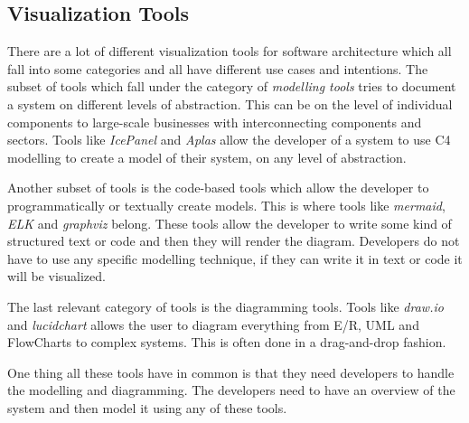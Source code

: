 \subsection{Visualization Tools}
There are a lot of different visualization tools for software architecture which all fall into some categories and all have different use cases and intentions.
The subset of tools which fall under the category of \textit{modelling tools} tries to document a system on different levels of abstraction. This can be on the level of individual components to large-scale businesses with interconnecting components and sectors.
Tools like \textit{IcePanel} and \textit{Aplas} allow the developer of a system to use C4 modelling to create a model of their system, on any level of abstraction.

Another subset of tools is the code-based tools which allow the developer to programmatically or textually create models. This is where tools like \textit{mermaid}, \textit{ELK} and \textit{graphviz} belong.
These tools allow the developer to write some kind of structured text or code and then they will render the diagram. Developers do not have to use any specific modelling technique, if they can write it in text or code it will be visualized.

The last relevant category of tools is the diagramming tools. Tools like \textit{draw.io} and \textit{lucidchart} allows the user to diagram everything from E/R, UML and FlowCharts to complex systems.
This is often done in a drag-and-drop fashion.

One thing all these tools have in common is that they need developers to handle the modelling and diagramming. The developers need to have an overview of the system and then model it using any of these tools.
